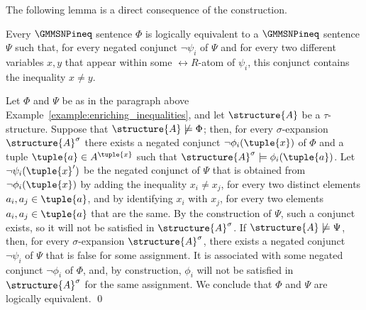 \documentclass{lmcs}
\begin{document}
The following lemma is a direct consequence of the construction.
\begin{lem}\label{lemma:gmmsnpineq_enrich_ineq} 
Every $\GMMSNPineq$ sentence $\Phi$ is logically equivalent to a $\GMMSNPineq$ sentence $\Psi$ such that, for every negated conjunct $\neg\psi_i$ of $\Psi$ and for every two different variables $x,y$ that appear within some $\rel{R}$-atom of $\psi_i$, this conjunct contains the inequality $x\not=y$.
\end{lem}
\proof
Let $\Phi$ and $\Psi$ be as in the paragraph above Example~\ref{example:enriching_inequalities}, and let $\structure{A}$ be a $\tau$-structure.
%
Suppose that $\structure{A}\not\models\Phi$; then, for every $\sigma$-expansion $\structure{A}^\sigma$ there exists a negated conjunct $\neg\phi_i(\tuple{x})$ of $\Phi$ and a tuple $\tuple{a}\in A^\tuple{x}$ such that $\structure{A}^\sigma\models\phi_i(\tuple{a})$.
%
Let $\neg\psi_i(\tuple{x}')$ be the negated conjunct of $\Psi$ that is obtained from $\neg\phi_i(\tuple{x})$ by adding the inequality $x_i\not=x_j$, for every two distinct elements $a_i,a_j\in\tuple{a}$, and by identifying $x_i$ with $x_j$, for every two elements $a_i,a_j\in\tuple{a}$ that are the same.
%
By the construction of $\Psi$, such a conjunct exists, so it will not be satisfied in $\structure{A}^\sigma$.
%
If $\structure{A}\not\models\Psi$, then, for every $\sigma$-expansion $\structure{A}^\sigma$, there exists a negated conjunct $\neg\psi_i$ of $\Psi$ that is false for some assignment.
%
It is associated with some negated conjunct $\neg\phi_i$ of $\Phi$, and, by construction, $\phi_i$ will not be satisfied in $\structure{A}^\sigma$ for the same assignment.
%
We conclude that $\Phi$ and $\Psi$ are logically equivalent.
\qed

\medskip
\end{document}
